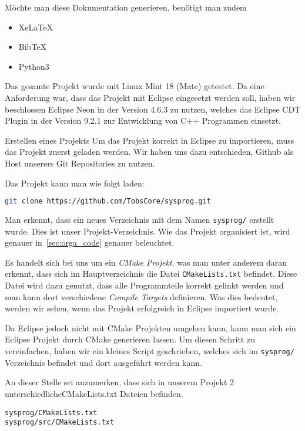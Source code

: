 Möchte man diese Dokumentation generieren, benötigt man zudem
\begin{itemize}
  \item XeLaTeX
  \item BibTeX
  \item Python3
\end{itemize}
Das gesamte Projekt wurde mit Linux Mint 18 (Mate) getestet. Da eine Anforderung war, dass das Projekt mit Eclipse eingesetzt werden soll, haben wir beschlossen Eclipse Neon in der Version 4.6.3 zu nutzen, welches das Eclipse CDT Plugin in der Version 9.2.1 zur Entwicklung von C++ Programmen einsetzt.

Erstellen eines Projekts
Um das Projekt korrekt in Eclipse zu importieren, muss das Projekt zuerst geladen werden. Wir haben uns dazu entschieden, Github als Host unserers Git Repositories zu nutzen.

Das Projekt kann man wie folgt laden:

\begin{lstlisting}[language=bash,numbers=none]
git clone https://github.com/TobsCore/sysprog.git
\end{lstlisting}

Man erkennt, dass ein neues Verzeichnis mit dem Namen \texttt{sysprog/} erstellt wurde. Dies ist unser Projekt-Verzeichnis. Wie das Projekt organisiert ist, wird genauer in~\ref{sec:orga_code} genauer beleuchtet.

Es handelt sich bei uns um ein \textit{CMake Projekt}, was man unter anderem daran erkennt, dass sich im Hauptverzeichnis die Datei \texttt{CMakeLists.txt} befindet. Diese Datei wird dazu genutzt, dass alle Programmteile korrekt gelinkt werden und man kann dort verschiedene \textit{Compile Targets} definieren. Was dies bedeutet, werden wir sehen, wenn das Projekt erfolgreich in Eclipse importiert wurde.

Da Eclipse jedoch nicht mit CMake Projekten umgehen kann, kann man sich ein Eclipse Projekt durch CMake generieren lassen. Um diesen Schritt zu vereinfachen, haben wir ein kleines Script geschrieben, welches sich im \texttt{sysprog/} Verzeichnis befindet und dort ausgeführt werden kann.



An dieser Stelle sei anzumerken, dass sich in unserem Projekt 2 unterschiedlicheCMakeLists.txt Dateien befinden.
\begin{verbatim}
sysprog/CMakeLists.txt
sysprog/src/CMakeLists.txt
\end{verbatim}

